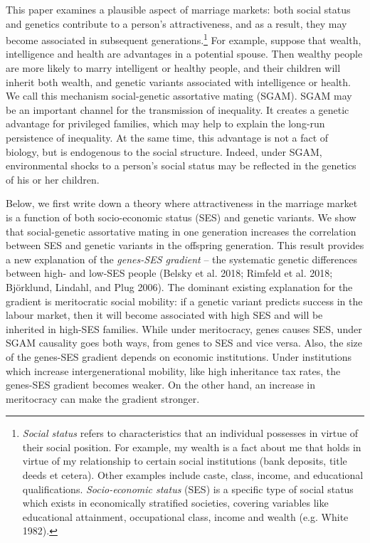 \documentclass[
  12pt,
]{article}
\theoremstyle{definition}
\theoremstyle{definition}
\theoremstyle{definition}
\theoremstyle{definition}
\theoremstyle{remark}
\begin{document}
This paper examines a plausible aspect of marriage markets: both social
status and genetics contribute to a person's attractiveness, and as a result,
they may become associated in subsequent
generations.\footnote{\emph{Social status} refers to characteristics that an individual
  possesses in virtue of their social position. For example, my wealth
  is a fact about me that holds in virtue of my relationship to
  certain social institutions (bank deposits, title deeds et cetera).
  Other examples include caste, class, income, and educational
  qualifications. \emph{Socio-economic status} (SES) is a specific type of
  social status which exists in economically stratified societies, covering
  variables like educational attainment, occupational class, income and
  wealth (e.g. White 1982).} For example, suppose that wealth, intelligence and
health are advantages in a potential spouse. Then wealthy people are more
likely to marry intelligent or healthy people, and their children will inherit
both wealth, and genetic variants associated with intelligence or health. We
call this mechanism social-genetic assortative mating (SGAM). SGAM may be an
important channel for the transmission of inequality. It creates a genetic
advantage for privileged families, which may help to explain the long-run
persistence of inequality. At the same time, this advantage is not a
fact of biology, but is endogenous to the social structure. Indeed, under
SGAM, environmental shocks to a person's social status may be reflected in
the genetics of his or her children.

Below, we first write down a theory where attractiveness in the
marriage market is a function of both socio-economic status (SES) and genetic
variants. We show that social-genetic assortative mating in one generation
increases the correlation between SES and genetic variants in the offspring
generation. This result provides a new explanation of the \emph{genes-SES gradient} --
the systematic genetic differences between high- and low-SES people
(Belsky et al. 2018; Rimfeld et al. 2018; Björklund, Lindahl, and Plug 2006). The
dominant existing explanation for the gradient is meritocratic social mobility:
if a genetic variant predicts success in the labour market, then it will
become associated with high SES and will be inherited in high-SES families.
While under meritocracy, genes causes SES, under SGAM causality goes both ways,
from genes to SES and vice versa. Also, the size of the genes-SES gradient
depends on economic institutions. Under institutions which increase
intergenerational mobility, like high inheritance tax rates, the genes-SES
gradient becomes weaker. On the other hand, an increase in meritocracy can
make the gradient stronger.
\end{document}
